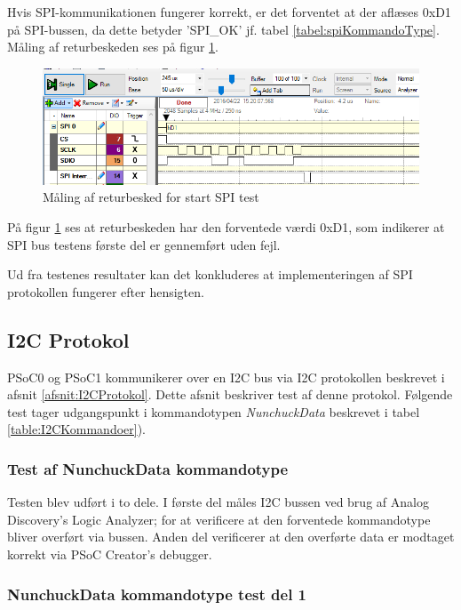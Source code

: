 Hvis SPI-kommunikationen fungerer korrekt, er det forventet at der aflæses 0xD1 på SPI-bussen, da dette betyder 'SPI\_OK' jf. tabel \ref{tabel:spiKommandoType}. Måling af returbeskeden ses på figur \ref{fig:SPItestSPIOK}.

\begin{figure}[H]
	\centering
	\includegraphics[width=\textwidth]{Test/images/SPItest/SPItestSPIOK1}
	\caption{Måling af returbesked for start SPI test} 
	\label{fig:SPItestSPIOK}
\end{figure}

På figur \ref{fig:SPItestSPIOK} ses at returbeskeden har den forventede værdi 0xD1, som indikerer at SPI bus testens første del er gennemført uden fejl.

Ud fra testenes resultater kan det konkluderes at implementeringen af SPI protokollen fungerer efter hensigten.



\subsection{I2C Protokol}
PSoC0 og PSoC1 kommunikerer over en I2C bus via I2C protokollen beskrevet i afsnit \ref{afsnit:I2CProtokol}. Dette afsnit beskriver test af denne protokol. Følgende test tager udgangspunkt i kommandotypen \textit{NunchuckData} beskrevet i tabel \ref{table:I2CKommandoer}).

\subsubsection{Test af NunchuckData kommandotype} 

Testen blev udført i to dele. I første del måles I2C bussen ved brug af Analog Discovery's Logic Analyzer; for at verificere at den forventede kommandotype bliver overført via bussen. Anden del verificerer at den overførte data er modtaget korrekt via PSoC Creator's debugger.

\subsubsection{NunchuckData kommandotype test del 1}

